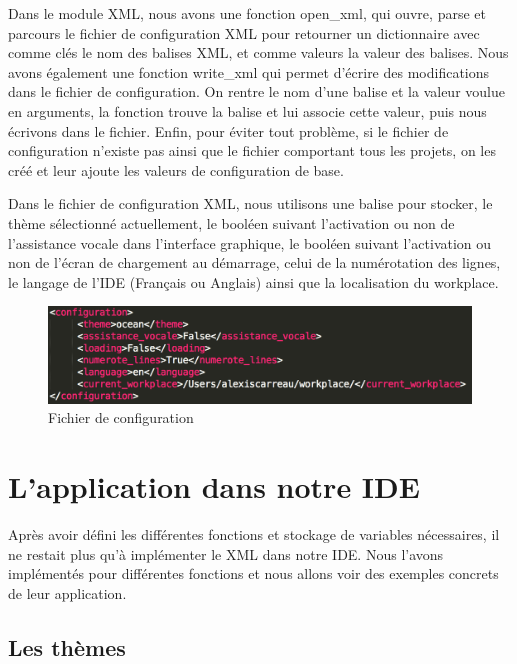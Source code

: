 \documentclass[a4paper,12pt]{article}
\begin{document}
Dans le module XML, nous avons une fonction open\_xml, qui ouvre, parse et parcours le fichier de configuration XML pour retourner un dictionnaire avec comme clés le nom des balises XML, et comme valeurs la valeur des balises. Nous avons également une fonction write\_xml qui permet d'écrire des modifications dans le fichier de configuration. On rentre le nom d'une balise et la valeur voulue en arguments, la fonction trouve la balise et lui associe cette valeur, puis nous écrivons dans le fichier. Enfin, pour éviter tout problème, si le fichier de configuration n'existe pas ainsi que le fichier comportant tous les projets, on les créé et leur ajoute les valeurs de configuration de base. 
		
Dans le fichier de configuration XML, nous utilisons une balise pour stocker, le thème sélectionné actuellement, le booléen suivant l'activation ou non de l'assistance vocale dans l'interface graphique, le booléen suivant l'activation ou non de l'écran de chargement au démarrage, celui de la numérotation des lignes, le langage de l'IDE (Français ou Anglais) ainsi que la localisation du workplace.
		
\begin{figure}[h!]
			\begin{center}
				\includegraphics[scale=0.6]{images/conf.png}
				\caption{Fichier de configuration}
			\end{center}
		\end{figure}

\section{L'application dans notre IDE}

Après avoir défini les différentes fonctions et stockage de variables nécessaires, il ne restait plus qu'à implémenter le XML dans notre IDE. Nous l'avons implémentés pour différentes fonctions et nous allons voir des exemples concrets de leur application.

\subsection{Les thèmes}
\end{document}
